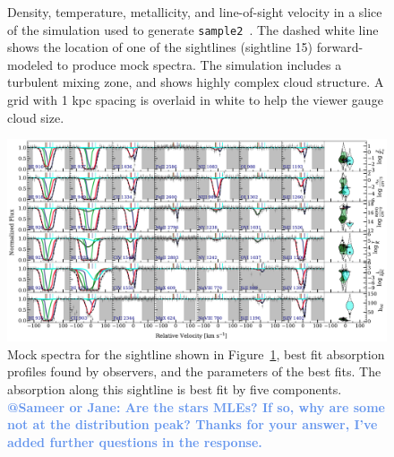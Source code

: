\documentclass[fleqn,usenatbib]{mnras}
\makeatletter
\newcommand{\atsameer}[1]{\textcolor{CornflowerBlue}{\textbf{@Sameer or Jane: #1}}}
\makeatother
\begin{document}
\begin{figure}
    \caption{
    Density, temperature, metallicity, and line-of-sight velocity in a slice of the simulation used to generate \texttt{sample2}~\citep{mandelker2020Instability}.
    The dashed white line shows the location of one of the sightlines (sightline 15) forward-modeled to produce mock spectra.
    The simulation includes a turbulent mixing zone, and shows highly complex cloud structure.
    A grid with 1 kpc spacing is overlaid in white to help the viewer gauge cloud size.
    }
    \label{f: sample2 ray 15}
\end{figure}

\begin{figure}
    \centering
    \includegraphics[width=\textwidth]{figures/sample2/best_fits/0015.pdf}
    \caption{
    Mock spectra for the sightline shown in Figure~\ref{f: sample2 ray 15},
    best fit absorption profiles found by observers,
    and the parameters of the best fits.
    The absorption along this sightline is best fit by five components.
    \atsameer{Are the stars MLEs? If so, why are some not at the distribution peak? Thanks for your answer, I've added further questions in the response.}
    }
    \label{f: sample2 spectrum 15}
    \end{figure}
\end{document}
